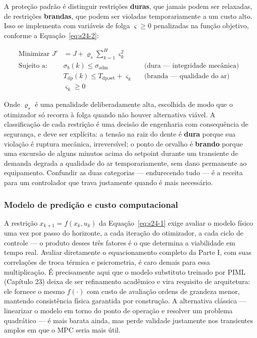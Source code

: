 \documentclass[12pt,a4paper]{article}
\numberwithin{equation}{section}
\numberwithin{table}{section}
\numberwithin{figure}{section}
\begin{document}
	A proteção padrão é distinguir restrições \textbf{duras}, que jamais podem ser relaxadas, de restrições \textbf{brandas}, que podem ser violadas temporariamente a um custo alto. Isso se implementa com variáveis de folga $\varsigma \ge 0$ penalizadas na função objetivo, conforme a Equação~\eqref{eq:s24-2}:

	\begin{equation}\label{eq:s24-2}
	\begin{aligned}
		\text{Minimizar } J' &= J + \varrho_s \sum_{k=1}^{H} \varsigma_k^2 \\[4pt]
		\text{Sujeito a: } & \sigma_b(k) \le \sigma_{\text{adm}} && \text{(dura — integridade mecânica)} \\
		& T_{\text{dp}}(k) \le T_{\text{dp,set}} + \varsigma_k && \text{(branda — qualidade do ar)} \\
		& \varsigma_k \ge 0
	\end{aligned}
\end{equation}

	Onde $\varrho_s$ é uma penalidade deliberadamente alta, escolhida de modo que o otimizador só recorra à folga quando não houver alternativa viável. A classificação de cada restrição é uma decisão de engenharia com consequência de segurança, e deve ser explícita: a tensão na raiz do dente é \textbf{dura} porque sua violação é ruptura mecânica, irreversível; o ponto de orvalho é \textbf{brando} porque uma excursão de alguns minutos acima do setpoint durante um transiente de demanda degrada a qualidade do ar temporariamente, sem dano permanente ao equipamento. Confundir as duas categorias — endurecendo tudo — é a receita para um controlador que trava justamente quando é mais necessário.

	\subsubsection*{Modelo de predição e custo computacional}

	A restrição $x_{k+1} = f(x_k, u_k)$ da Equação~\eqref{eq:s24-1} exige avaliar o modelo físico uma vez por passo do horizonte, a cada iteração do otimizador, a cada ciclo de controle — o produto desses três fatores é o que determina a viabilidade em tempo real. Avaliar diretamente o equacionamento completo da Parte I, com suas correlações de troca térmica e psicrometria, é caro demais para essa multiplicação. É precisamente aqui que o modelo substituto treinado por PIML (Capítulo 23) deixa de ser refinamento acadêmico e vira requisito de arquitetura: ele fornece o mesmo $f(\cdot)$ com custo de avaliação ordens de grandeza menor, mantendo consistência física garantida por construção. A alternativa clássica — linearizar o modelo em torno do ponto de operação e resolver um problema quadrático — é mais barata ainda, mas perde validade justamente nos transientes amplos em que o MPC seria mais útil.
\end{document}
